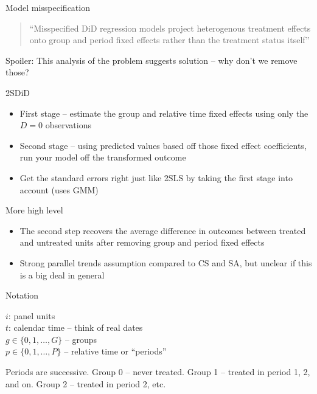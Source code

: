 \documentclass{beamer}
\begin{document}
\begin{frame}{Model misspecification}

\begin{quote}
``Misspecified DiD regression models project heterogenous treatment effects onto group and period fixed effects rather than the treatment status itself''
\end{quote}

\bigskip

Spoiler: This analysis of the problem suggests solution -- why don't we remove those?

\end{frame}


\begin{frame}{2SDiD}

\begin{itemize}
\item First stage -- estimate the group and relative time fixed effects using only the $D=0$ observations
\item Second stage -- using predicted values based off those fixed effect coefficients, run your model off the transformed outcome 
\item Get the standard errors right just like 2SLS by taking the first stage into account (uses GMM)
\end{itemize}

\end{frame}

\begin{frame}{More high level}

\begin{itemize}
\item The second step recovers the average difference in outcomes between treated and untreated units after removing group and period fixed effects
\item Strong parallel trends assumption compared to CS and SA, but unclear if this is a big deal in general
\end{itemize}

\end{frame}

\begin{frame}{Notation}

$i$: panel units \\
$t$: calendar time -- think of real dates\\
$g\in \{0,1, \dots , G \}$ -- groups\\
$p \in \{0,1, \dots , P \}$  -- relative time or ``periods''\\

\bigskip

Periods are successive.  Group 0 -- never treated. Group 1 -- treated in period 1, 2, and on.  Group 2 -- treated in period 2, etc.

\end{frame}
\end{document}
